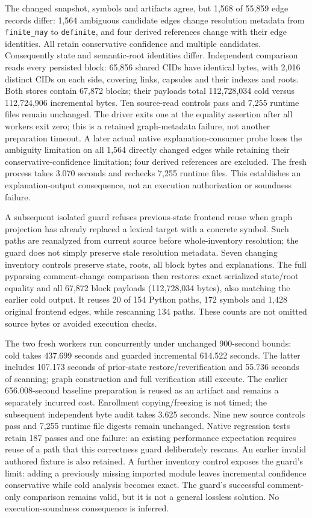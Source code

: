 The changed snapshot, symbols and artifacts agree, but 1,568 of 55,859 edge
records differ: 1,564 ambiguous candidate edges change resolution metadata from
\texttt{finite\_may} to \texttt{definite}, and four derived references change
with their edge identities. All retain conservative confidence and multiple
candidates. Consequently state and semantic-root identities differ. Independent
comparison reads every persisted block: 65,856 shared CIDs have identical bytes,
with 2,016 distinct CIDs on each side, covering links, capsules and their indexes
and roots. Both stores contain 67,872 blocks; their payloads total 112,728,034
cold versus 112,724,906 incremental bytes. Ten source-read controls pass and
7,255 runtime files remain unchanged. The driver exits one at the equality
assertion after all workers exit zero; this is a retained graph-metadata failure,
not another preparation timeout. A later actual native explanation-consumer
probe loses the ambiguity limitation on all 1,564 directly changed edges while
retaining their conservative-confidence limitation; four derived references
are excluded. The fresh process takes 3.070 seconds and rechecks 7,255 runtime
files. This establishes an explanation-output consequence, not an execution
authorization or soundness failure.

A subsequent isolated guard refuses previous-state frontend reuse when graph
projection has already replaced a lexical target with a concrete symbol.
Such paths are reanalyzed from current source before whole-inventory resolution;
the guard does not simply preserve stale resolution metadata. Seven changing
inventory controls preserve state, roots, all block bytes and explanations.
The full pyparsing comment-change comparison then restores exact serialized
state/root equality and all 67,872 block payloads (112,728,034 bytes), also
matching the earlier cold output. It reuses 20 of 154 Python paths, 172 symbols
and 1,428 original frontend edges, while rescanning 134 paths. These counts
are not omitted source bytes or avoided execution checks.

The two fresh workers run concurrently under unchanged 900-second bounds:
cold takes 437.699 seconds and guarded incremental 614.522 seconds. The latter
includes 107.173 seconds of prior-state restore/reverification and 55.736
seconds of scanning; graph construction and full verification still execute.
The earlier 656.008-second baseline preparation is reused as an artifact and
remains a separately incurred cost. Enrollment copying/freezing is not timed;
the subsequent independent byte audit takes 3.625 seconds. Nine new source
controls pass and 7,255 runtime file digests remain unchanged. Native regression
tests retain 187 passes and one failure: an existing performance expectation
requires reuse of a path that this correctness guard deliberately rescans.
An earlier invalid authored fixture is also retained. A further inventory
control exposes the guard's limit: adding a previously missing imported module
leaves incremental confidence conservative while cold analysis becomes exact.
The guard's successful comment-only comparison remains valid, but it is not a
general lossless solution. No execution-soundness consequence is inferred.

